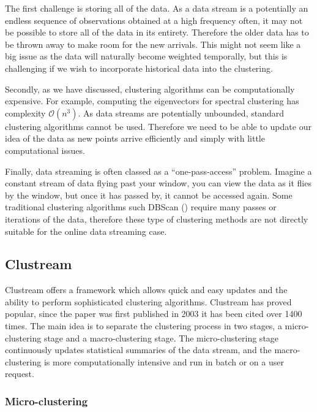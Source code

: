 The first challenge is storing all of the data. As a data stream is a potentially an endless sequence of observations obtained at a high frequency often, it may not be possible to store all of the data in its entirety. Therefore the older data has to be thrown away to make room for the new arrivals. This might not seem like a big issue as the data will naturally become weighted temporally, but this is challenging if we wish to incorporate historical data into the clustering.

Secondly, as we have discussed, clustering algorithms can be computationally expensive. For example, computing the eigenvectors for spectral clustering has complexity $\mathcal{O}(n^3)$. As data streams are potentially unbounded, standard clustering algorithms cannot be used.  Therefore we need to be able to update our idea of the data as new points arrive efficiently and simply with little computational issues.

Finally, data streaming is often classed as a ``one-pass-access'' problem. Imagine a constant stream of data flying past your window, you can view the data as it flies by the window, but once it has passed by, it cannot be accessed again. Some traditional clustering algorithms such DBScan (\cite{Ester1996}) require many passes or iterations of the data, therefore these type of clustering methods are not directly suitable for the online data streaming case.
 
\subsection{Clustream}

Clustream \cite{Aggarwal2003} offers a framework which allows quick and easy updates and the ability to perform sophisticated clustering algorithms. Clustream has proved popular, since the paper was first published in 2003 it has been cited over 1400 times. The main idea is to separate the clustering process in two stages, a micro-clustering stage and a macro-clustering stage. The  micro-clustering stage continuously updates statistical summaries of the data stream, and the macro-clustering is more computationally intensive and run in batch or on a user request. 

\subsubsection{Micro-clustering}


